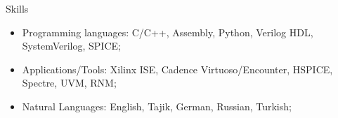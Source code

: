 \begin{rSection}{Skills}
  \begin{itemize}
  \item Programming languages: C/C++, Assembly, Python, Verilog HDL, SystemVerilog, SPICE;
  \item Applications/Tools: Xilinx ISE, Cadence Virtuoso/Encounter, HSPICE, Spectre, UVM, RNM;
  \item Natural Languages: English, Tajik, German, Russian, Turkish;
  \end{itemize}
\end{rSection}
